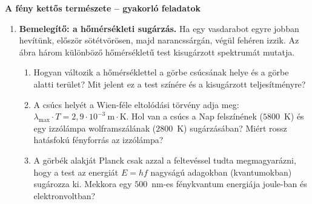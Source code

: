 \documentclass[12pt]{article}
\begin{document}
\begin{center}\vspace*{-0.4cm}
  {\Large\bfseries A fény kettős természete -- gyakorló feladatok}\\[4pt]
\end{center}

\begin{minipage}[t]{0.60\linewidth}\vspace{0pt}
\begin{enumerate}
\item \textbf{Bemelegítő: a hőmérsékleti sugárzás.} Ha egy vasdarabot egyre jobban
  hevítünk, először sötétvörösen, majd narancssárgán, végül fehéren izzik. Az ábra
  három különböző hőmérsékletű test kisugárzott spektrumát mutatja.
  \begin{enumerate}
    \item Hogyan változik a hőmérséklettel a görbe csúcsának helye és a görbe alatti
      terület? Mit jelent ez a test színére és a kisugárzott teljesítményre?
    \item A csúcs helyét a Wien-féle eltolódási törvény adja meg:
      $\lambda_\text{max}\cdot T = 2{,}9\cdot 10^{-3}~\text{m}\cdot\text{K}$. Hol van a
      csúcs a Nap felszínének ($5800$~K) és egy izzólámpa wolframszálának ($2800$~K)
      sugárzásában? Miért rossz hatásfokú fényforrás az izzólámpa?
    \item A görbék alakját Planck csak azzal a feltevéssel tudta megmagyarázni, hogy a
      test az energiát $E = hf$ nagyságú adagokban (kvantumokban) sugározza ki. Mekkora
      egy $500$~nm-es fénykvantum energiája joule-ban és elektronvoltban?
  \end{enumerate}
\end{enumerate}
\end{minipage}\hfill
\end{document}
